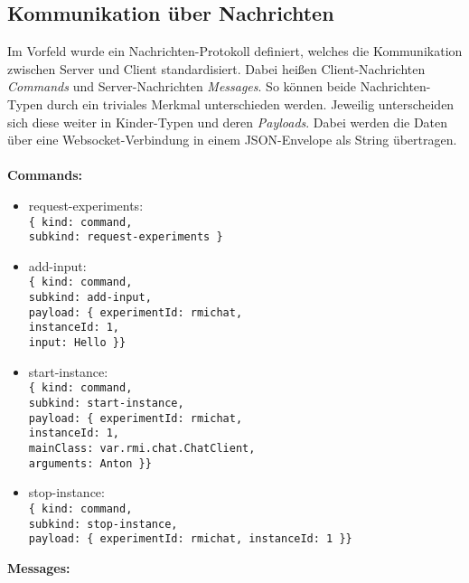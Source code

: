 \subsection{Kommunikation über Nachrichten}
Im Vorfeld wurde ein Nachrichten-Protokoll definiert, welches die Kommunikation zwischen Server und Client standardisiert.
Dabei heißen Client-Nachrichten \textit{Commands} und Server-Nachrichten \textit{Messages}.
So können beide Nachrichten-Typen durch ein triviales Merkmal unterschieden werden.
Jeweilig unterscheiden sich diese weiter in Kinder-Typen und deren \textit{Payloads}.
Dabei werden die Daten über eine Websocket-Verbindung in einem JSON-Envelope als String übertragen.
\\\\
\textbf{Commands:}
\begin{itemize}
  \item request-experiments:
    \\\texttt{\{ kind: command, \\subkind: request-experiments \}}
  \item add-input:
    \\\texttt{\{ kind: command, \\subkind: add-input,
    \\ payload: \{ experimentId: rmichat, \\\hspace*{1.8cm}instanceId: 1, \\\hspace*{1.8cm}input: Hello \}\}}
  \item start-instance:
    \\\texttt{\{ kind: command, \\ subkind: start-instance,
    \\ payload: \{ experimentId: rmichat, \\\hspace*{1.8cm}instanceId: 1, \\\hspace*{1.8cm}mainClass: var.rmi.chat.ChatClient, \\\hspace*{1.8cm}arguments: Anton \}\}}
  \item stop-instance:
    \\\texttt{\{ kind: command, \\ subkind: stop-instance,
    \\ payload: \{ experimentId: rmichat, instanceId: 1 \}\}}
\end{itemize}
\textbf{Messages:}
